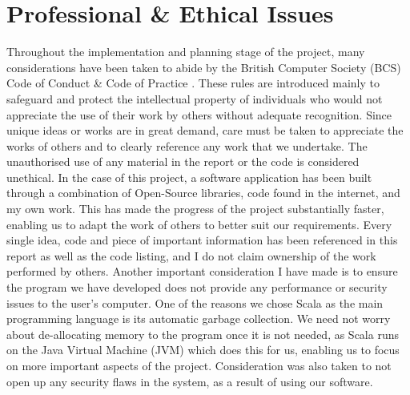 \chapter{Professional \& Ethical Issues}

Throughout the implementation and planning stage of the project, many considerations have been taken to abide by the British Computer Society (BCS) Code of Conduct \& Code of Practice \cite{bcsCodeOfConduct}. These rules are introduced mainly to safeguard and protect the intellectual property of individuals who would not appreciate the use of their work by others without adequate recognition. Since unique ideas or works are in great demand, care must be taken to appreciate the works of others and to clearly reference any work that we undertake. The unauthorised use of any material in the report or the code is considered unethical. In the case of this project, a software application has been built through a combination of Open-Source libraries, code found in the internet, and my own work. This has made the progress of the project substantially faster, enabling us to adapt the work of others to better suit our requirements. Every single idea, code and piece of important information has been referenced in this report as well as the code listing, and I do not claim ownership of the work performed by others. Another important consideration I have made is to ensure the program we have developed does not provide any performance or security issues to the user's computer. One of the reasons we chose Scala as the main programming language is its automatic garbage collection. We need not worry about de-allocating memory to the program once it is not needed, as Scala runs on the Java Virtual Machine (JVM) which does this for us, enabling us to focus on more important aspects of the project. Consideration was also taken to not open up any security flaws in the system, as a result of using our software.